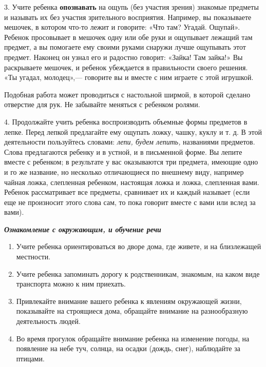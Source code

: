 \documentclass[a5paper]{book}
\renewcommand{\emph}[1]{\textit{#1}}
\begin{document}
3. Учите ребенка \textbf{опознавать} на ощупь (без участия зрения)
знакомые предметы и называть их без участия зрительного восприятия.
Например, вы показываете мешочек, в котором что-то лежит и говорите:
«Что там? Угадай. Ощупай». Ребенок просовывает в мешочек одну или обе
руки и ощупывает лежащий там предмет, а вы помогаете ему своими руками
снаружи лучше ощупывать этот предмет. Наконец он узнал его и радостно
говорит: «Зайка! Там зайка!» Вы раскрываете мешочек, и ребенок
убеждается в правильности своего решения. «Ты угадал, молодец»,---
говорите вы и вместе с ним играете с этой игрушкой.

Подобная работа может проводиться с настольной ширмой, в которой сделано
отверстие для рук. Не забывайте меняться с ребенком ролями.

4. Продолжайте учить ребенка воспроизводить объемные формы предметов в
лепке. Перед лепкой предлагайте ему ощупать ложку, чашку, куклу и т. д.
В этой деятельности пользуйтесь словами: \emph{лепи, будем лепить,}
названиями предметов. Слова предлагаются ребенку и в устной, и в
письменной форме. Вы лепите вместе с ребенком; в результате у вас
оказываются три предмета, имеющие одно и го же название, но несколько
отличающиеся по внешнему виду, например чайная ложка, слепленная
ребенком, настоящая ложка и ложка, слепленная вами. Ребенок
рассматривает все предметы, сравнивает их и каждый называет (если еще не
произносит этого слова сам, то пока говорит вместе с вами или вслед за
вами).

\emph{\textbf{Ознакомление с окружающим, и обучение речи}}


\begin{enumerate}
\def\labelenumi{\arabic{enumi}.}
\item
  
  Учите ребенка ориентироваться во дворе дома, где живете, и на
  близлежащей местности.
  
\item
  
  Учите ребенка запоминать дорогу к родственникам, знакомым, на каком
  виде транспорта можно к ним приехать.
  
\item
  
  Привлекайте внимание вашего ребенка к явлениям окружающей жизни,
  показывайте на строящиеся дома, обращайте внимание на разнообразную
  деятельность людей.
  
\item
  
  Во время прогулок обращайте внимание ребенка на изменение погоды, на
  появление на небе туч, солнца, на осадки (дождь, снег), наблюдайте за
  птицами.
  
\end{enumerate}
\end{document}
